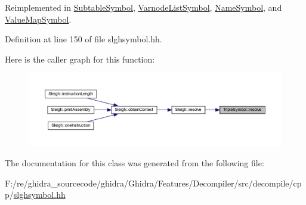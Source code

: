 Reimplemented in \mbox{\hyperlink{class_subtable_symbol_aeb4624a84c6ef3e18f8de1c43687373d}{Subtable\+Symbol}}, \mbox{\hyperlink{class_varnode_list_symbol_a6757d4ecc0f1844adf14b8370835602a}{Varnode\+List\+Symbol}}, \mbox{\hyperlink{class_name_symbol_aad6d2abf3eaaeb6c92bc2a2b7f4c0a4c}{Name\+Symbol}}, and \mbox{\hyperlink{class_value_map_symbol_a7287386595bd0d870f78e83490637c53}{Value\+Map\+Symbol}}.



Definition at line 150 of file slghsymbol.\+hh.

Here is the caller graph for this function\+:
\nopagebreak
\begin{figure}[H]
\begin{center}
\leavevmode
\includegraphics[width=350pt]{class_triple_symbol_adc7ba86d4674c1b3cc8894cfcac33bf1_icgraph}
\end{center}
\end{figure}


The documentation for this class was generated from the following file\+:\begin{DoxyCompactItemize}
\item 
F\+:/re/ghidra\+\_\+sourcecode/ghidra/\+Ghidra/\+Features/\+Decompiler/src/decompile/cpp/\mbox{\hyperlink{slghsymbol_8hh}{slghsymbol.\+hh}}\end{DoxyCompactItemize}
